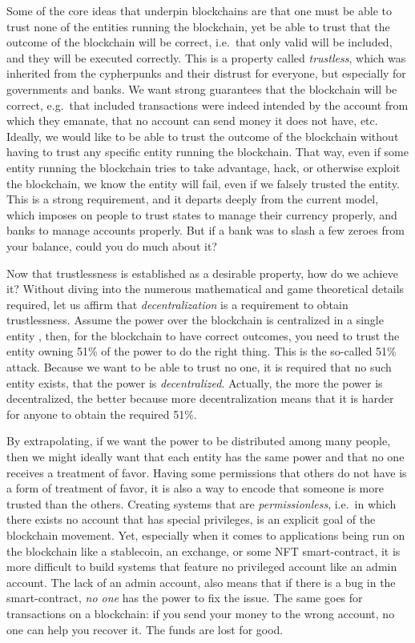 Some of the core ideas that underpin blockchains are that one must be able to trust none of the entities running the blockchain, yet be able to trust that the outcome of the blockchain will be correct, i.e.\ that only valid will be included, and they will be executed correctly.
This is a property called \emph{trustless}, which was inherited from the cypherpunks and their distrust for everyone, but especially for governments and banks.
We want strong guarantees that the blockchain will be correct, e.g.\ that included transactions were indeed intended by the account from which they emanate, that no account can send money it does not have, etc.
Ideally, we would like to be able to trust the outcome of the blockchain without having to trust any specific entity running the blockchain.
That way, even if some entity running the blockchain tries to take advantage, hack, or otherwise exploit the blockchain, we know the entity will fail, even if we falsely trusted the entity.
This is a strong requirement, and it departs deeply from the current model, which imposes on people to trust states to manage their currency properly, and banks to manage accounts properly.
But if a bank was to slash a few zeroes from your balance, could you do much about it?

Now that trustlessness is established as a desirable property, how do we achieve it?
Without diving into the numerous mathematical and game theoretical details required, let us affirm that \emph{decentralization} is a requirement to obtain trustlessness.
Assume the power over the blockchain is centralized in a single entity%
, then, for the blockchain to have correct outcomes, you need to trust the entity owning 51\% of the power to do the right thing.
This is the so-called 51\% attack.
Because we want to be able to trust no one, it is required that no such entity exists, that the power is \emph{decentralized}.
Actually, the more the power is decentralized, the better because more decentralization means that it is harder for anyone to obtain the required 51\%.

By extrapolating, if we want the power to be distributed among many people, then we might ideally want that each entity has the same power and that no one receives a treatment of favor.
Having some permissions that others do not have is a form of treatment of favor, it is also a way to encode that someone is more trusted than the others.
Creating systems that are \emph{permissionless}, i.e.\ in which there exists no account that has special privileges, is an explicit goal of the blockchain movement.
Yet, especially when it comes to applications being run on the blockchain like a stablecoin, an exchange, or some NFT smart-contract, it is more difficult to build systems that feature no privileged account like an admin account.
The lack of an admin account, also means that if there is a bug in the smart-contract, \emph{no one} has the power to fix the issue.
The same goes for transactions on a blockchain: if you send your money to the wrong account, no one can help you recover it.
The funds are lost for good.

